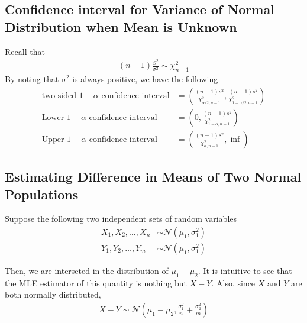 \documentclass[../probability-notes.tex]{subfiles}
\begin{document}
    \subsection{Confidence interval for Variance of Normal Distribution when Mean is Unknown}
    Recall that
    \begin{align*}
        (n-1)\frac{S^{2}}{\sigma^{2}} \sim \chi_{n-1}^{2}
    \end{align*}
    By noting that $\sigma^{2}$ is always positive, we have the following
    \begin{align*}
        \text{two sided $1 - \alpha$ confidence interval} &= (\frac{(n-1)s^{2}}{\chi_{\alpha/2, n-1}^{2}}, \frac{(n-1)s^{2}}{\chi_{1 - \alpha/2, n-1}^{2}})\\
        \text{Lower $1-\alpha$ confidence interval} &= (0, \frac{(n-1)s^{2}}{\chi_{1 - \alpha, n-1}^{2}})\\
        \text{Upper $1-\alpha$ confidence interval} &= (\frac{(n-1)s^{2}}{\chi_{\alpha, n-1}^{2}}, \inf)
    \end{align*}


    \subsection{Estimating Difference in Means of Two Normal Populations}\label{mean_diff_normal}
    Suppose the following two independent sets of random variables
    \begin{align*}
        X_{1}, X_{2}, \ldots, X_{n} &\sim \mathcal{N}(\mu_{1}, \sigma_{1}^{2})\\
        Y_{1}, Y_{2}, \ldots, Y_{m} &\sim \mathcal{N}(\mu_{1}, \sigma_{1}^{2})
    \end{align*}

    Then, we are interseted in the distribution of $\mu_{1} - \mu_{2}$. It is intuitive to see that the MLE estimator of this quantity is nothing but $\overline{X} - \overline{Y}$. Also, since $\overline{X}$ and $\overline{Y}$ are both normally distributed,
    \begin{align*}
        \overline{X} - \overline{Y} \sim \mathcal{N}(\mu_{1} - \mu_{2}, \frac{\sigma_{1}^{2}}{n} + \frac{\sigma_{2}^{2}}{m})
    \end{align*}
\end{document}
